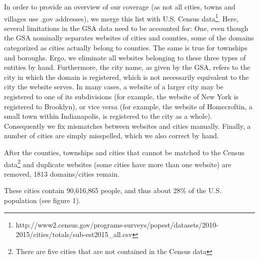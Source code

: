 \documentclass[11pt]{article}
\begin{document}
In order to provide an overview of our coverage (as not all cities, towns and villages use .gov addresses), we merge this list with U.S. Census data\footnote{http://www2.census.gov/programs-surveys/popest/datasets/2010-2015/cities/totals/sub-est2015\_all.csv}. Here, several limitations in the GSA data need to be accounted for: One, even though the GSA nominally separates websites of cities and counties, some of the domains categorized as cities actually belong to counties. The same is true for townships and boroughs. Ergo, we eliminate all websites belonging to these three types of entities by hand. Furthermore, the city name, as given by the GSA, refers to the city in which the domain is registered, which is not necessarily equivalent to the city the website serves. In many cases, a website of a larger city may be registered to one of its subdivisions (for example, the website of New York is registered to Brooklyn), or vice versa (for example, the website of Homecroftin, a small town within Indianapolis, is registered to the city as a whole). Consequently we fix mismatches between websites and cities manually. Finally, a number of cities are simply misspelled, which we also correct by hand.

After the counties, townships and cities that cannot be matched to the Census data\footnote{There are five cities that are not contained in the Census data} and duplicate websites (some cities have more than one website) are removed, 1813 domains/cities remain.

These cities contain 90,616,865 people, and thus about 28\% of the U.S. population (see figure 1).
\end{document}
